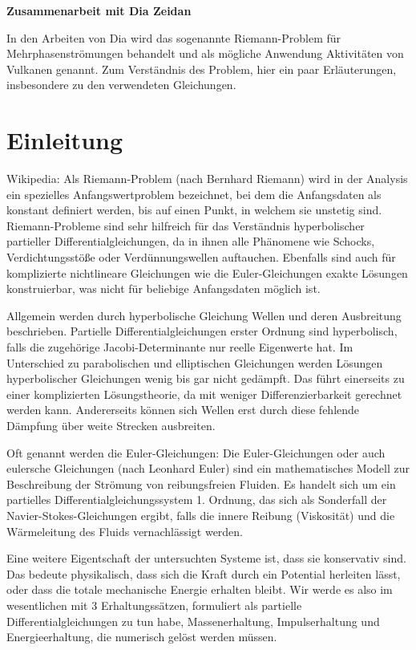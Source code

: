 \begin{center}
{\large \bf Zusammenarbeit mit Dia Zeidan}
\end{center}

In den Arbeiten von Dia wird das sogenannte Riemann-Problem für
Mehrphasenströmungen behandelt und als mögliche Anwendung Aktivitäten
von Vulkanen genannt. Zum Verständnis des Problem, hier ein paar
Erläuterungen, insbesondere zu den verwendeten Gleichungen.


\section{Einleitung}


Wikipedia: Als Riemann-Problem (nach Bernhard Riemann) wird in der
Analysis ein spezielles Anfangswertproblem bezeichnet, bei dem die
Anfangsdaten als konstant definiert werden, bis auf einen Punkt, in
welchem sie unstetig sind. Riemann-Probleme sind sehr hilfreich für
das Verständnis hyperbolischer partieller Differentialgleichungen, da
in ihnen alle Phänomene wie Schocks, Verdichtungsstöße oder
Verdünnungswellen auftauchen. Ebenfalls sind auch für komplizierte
nichtlineare Gleichungen wie die Euler-Gleichungen exakte Lösungen
konstruierbar, was nicht für beliebige Anfangsdaten möglich ist.

Allgemein werden durch hyperbolische Gleichung Wellen und deren
Ausbreitung beschrieben. Partielle Differentialgleichungen erster
Ordnung sind hyperbolisch, falls die zugehörige Jacobi-Determinante
nur reelle Eigenwerte hat. Im Unterschied zu
parabolischen und elliptischen Gleichungen werden Lösungen
hyperbolischer Gleichungen wenig bis gar nicht gedämpft. Das führt
einerseits zu einer komplizierten Lösungstheorie, da mit weniger
Differenzierbarkeit gerechnet werden kann. Andererseits können sich
Wellen erst durch diese fehlende Dämpfung über weite Strecken
ausbreiten.

Oft genannt werden die Euler-Gleichungen: Die Euler-Gleichungen oder
auch eulersche Gleichungen (nach Leonhard Euler) sind ein
mathematisches Modell zur Beschreibung der Strömung von reibungsfreien
Fluiden. Es handelt sich um ein partielles
Differentialgleichungssystem 1. Ordnung, das sich als Sonderfall der
Navier-Stokes-Gleichungen ergibt, falls die innere Reibung
(Viskosität) und die Wärmeleitung des Fluids vernachlässigt werden.

Eine weitere Eigentschaft der untersuchten Systeme ist, dass sie
konservativ sind. Das bedeute physikalisch, dass sich die Kraft durch
ein Potential herleiten lässt, oder dass die totale mechanische
Energie erhalten bleibt. Wir werde es also im wesentlichen mit 3
Erhaltungssätzen, formuliert als partielle Differentialgleichungen zu
tun habe, Massenerhaltung, Impulserhaltung und Energieerhaltung, die
numerisch gelöst werden müssen.

